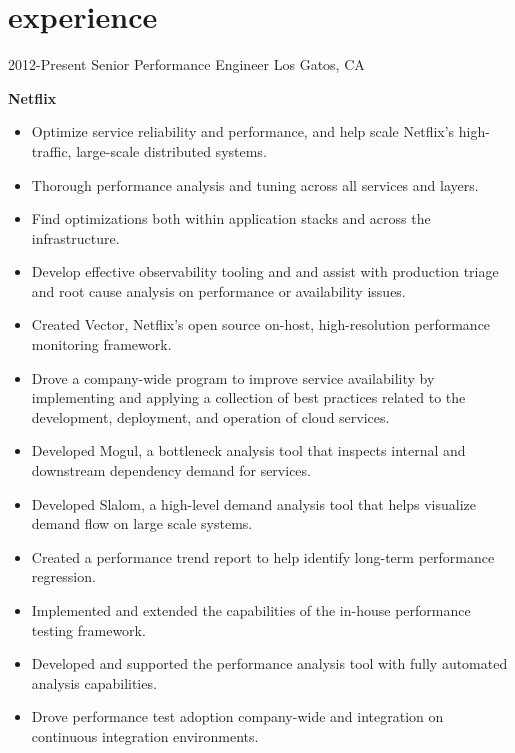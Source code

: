 
\section{experience}

\begin{entrylist}
  \entry
    {2012-Present}
    {Senior Performance Engineer}
    {Los Gatos, CA}
    {
      \textbf{Netflix}
      \begin{itemize}
        \item Optimize service reliability and performance, and help scale Netflix's high-traffic, large-scale distributed systems.
        \item Thorough performance analysis and tuning across all services and layers.
        \item Find optimizations both within application stacks and across the infrastructure.
        \item Develop effective observability tooling and and assist with production triage and root cause analysis on performance or availability issues.  
      \end{itemize}
      \begin{itemize}
        \item Created Vector, Netflix's open source on-host, high-resolution performance monitoring framework.
        \item Drove a company-wide program to improve service availability by implementing and applying a collection of best practices related to the development, deployment, and operation of cloud services.
        \item Developed Mogul, a bottleneck analysis tool that inspects internal and downstream dependency demand for services.
        \item Developed Slalom, a high-level demand analysis tool that helps visualize demand flow on large scale systems.
        \item Created a performance trend report to help identify long-term performance regression.
        \item Implemented and extended the capabilities of the in-house performance testing framework.
        \item Developed and supported the performance analysis tool with fully automated analysis capabilities.
        \item Drove performance test adoption company-wide and integration on continuous integration environments.
      \end{itemize}
}
\end{entrylist}
